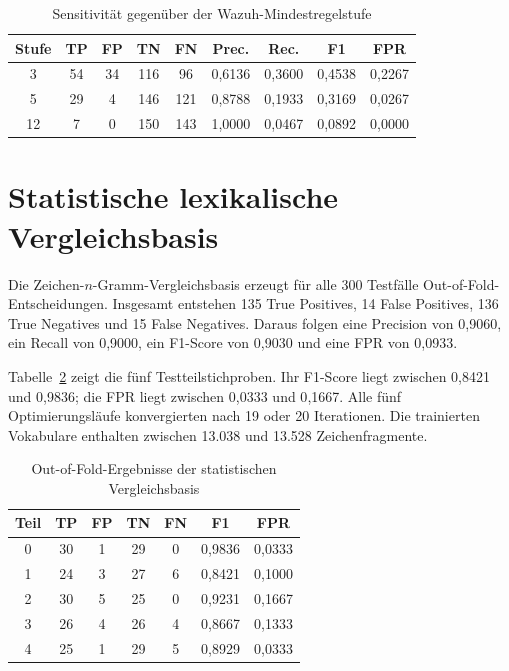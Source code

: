 \documentclass[12pt,a4paper,oneside,parskip=half]{scrreprt}
\begin{document}
\begin{table}[H]
\centering
\caption[Sensitivität gegenüber der Wazuh-Mindestregelstufe]{Sensitivität gegenüber der Wazuh-Mindestregelstufe}
\label{tab:wazuh-levels}
\small
\begin{tabular}{|c|c|c|c|c|c|c|c|c|}
\hline
\textbf{Stufe} & \textbf{TP} & \textbf{FP} & \textbf{TN} & \textbf{FN} & \textbf{Prec.} & \textbf{Rec.} & \textbf{F1} & \textbf{FPR}\\
\hline
3 & 54 & 34 & 116 & 96 & 0{,}6136 & 0{,}3600 & 0{,}4538 & 0{,}2267\\
\hline
5 & 29 & 4 & 146 & 121 & 0{,}8788 & 0{,}1933 & 0{,}3169 & 0{,}0267\\
\hline
12 & 7 & 0 & 150 & 143 & 1{,}0000 & 0{,}0467 & 0{,}0892 & 0{,}0000\\
\hline
\end{tabular}
\end{table}
\section{Statistische lexikalische Vergleichsbasis}
Die Zeichen-\(n\)-Gramm-Vergleichsbasis erzeugt für alle 300 Testfälle Out-of-Fold-Entscheidungen. Insgesamt entstehen 135 True Positives, 14 False Positives, 136 True Negatives und 15 False Negatives. Daraus folgen eine Precision von 0{,}9060, ein Recall von 0{,}9000, ein F1-Score von 0{,}9030 und eine FPR von 0{,}0933.

Tabelle~\ref{tab:baseline-folds} zeigt die fünf Testteilstichproben. Ihr F1-Score liegt zwischen 0{,}8421 und 0{,}9836; die FPR liegt zwischen 0{,}0333 und 0{,}1667. Alle fünf Optimierungsläufe konvergierten nach 19 oder 20 Iterationen. Die trainierten Vokabulare enthalten zwischen 13.038 und 13.528 Zeichenfragmente.

\begin{table}[H]
\centering
\caption[Out-of-Fold-Ergebnisse der statistischen Vergleichsbasis]{Out-of-Fold-Ergebnisse der statistischen Vergleichsbasis}
\label{tab:baseline-folds}
\small
\begin{tabular}{|c|c|c|c|c|c|c|}
\hline
\textbf{Teil} & \textbf{TP} & \textbf{FP} & \textbf{TN} & \textbf{FN} & \textbf{F1} & \textbf{FPR}\\
\hline
0 & 30 & 1 & 29 & 0 & 0{,}9836 & 0{,}0333\\
\hline
1 & 24 & 3 & 27 & 6 & 0{,}8421 & 0{,}1000\\
\hline
2 & 30 & 5 & 25 & 0 & 0{,}9231 & 0{,}1667\\
\hline
3 & 26 & 4 & 26 & 4 & 0{,}8667 & 0{,}1333\\
\hline
4 & 25 & 1 & 29 & 5 & 0{,}8929 & 0{,}0333\\
\hline
\end{tabular}
\end{table}
\end{document}
